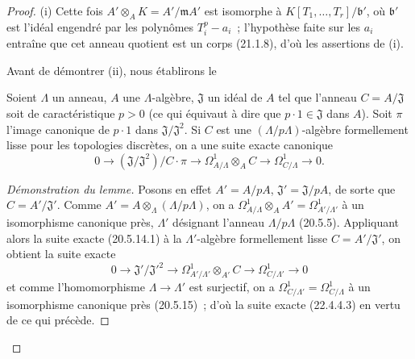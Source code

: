 \begin{proof}
(i) Cette fois $A'\otimes_AK=A'/\mathfrak mA'$ est isomorphe à
$K[T_1,\ldots,T_r]/\mathfrak b'$, où $\mathfrak b'$ est l'idéal engendré
par les polynômes $T_i^p-a_i$~; l'hypothèse faite sur les $a_i$ entraîne que
cet anneau quotient est un corps (21.1.8), d'où les assertions de (i).

Avant de démontrer (ii), nous établirons le

\begin{lemma}[22.4.4.2]
\label{0.22.4.4.2-fr}
Soient $\Lambda$ un anneau, $A$ une $\Lambda$-algèbre, $\mathfrak J$ un
idéal de $A$ tel que l'anneau $C=A/\mathfrak J$ soit de caractéristique
$p>0$ (ce qui équivaut à dire que $p\cdot1\in\mathfrak J$ dans $A$). Soit
$\pi$ l'image canonique de $p\cdot1$ dans
$\mathfrak J/\mathfrak J^2$. Si $C$ est une $(\Lambda/p\Lambda)$-algèbre
formellement lisse pour les topologies discrètes, on a une suite exacte
canonique
\begin{equation}
\label{0.22.4.4.3-fr}
  0\longrightarrow(\mathfrak J/\mathfrak J^2)/C\cdot\pi
  \longrightarrow\Omega^1_{A/\Lambda}\otimes_AC
  \longrightarrow\Omega^1_{C/\Lambda}\longrightarrow0.
  \tag{22.4.4.3}
\end{equation}
\end{lemma}

\begin{proof}[Démonstration du lemme]
Posons en effet $A'=A/pA$, $\mathfrak J'=\mathfrak J/pA$, de sorte que
$C=A'/\mathfrak J'$. Comme
$A'=A\otimes_\Lambda(\Lambda/p\Lambda)$, on a
$\Omega^1_{A/\Lambda}\otimes_AA'=\Omega^1_{A'/\Lambda'}$ à un
isomorphisme canonique près, $\Lambda'$ désignant l'anneau
$\Lambda/p\Lambda$ (20.5.5). Appliquant alors la suite exacte (20.5.14.1) à
la $\Lambda'$-algèbre formellement lisse $C=A'/\mathfrak J'$, on obtient la
suite exacte
\[
  0\longrightarrow\mathfrak J'/\mathfrak J'^2
  \longrightarrow\Omega^1_{A'/\Lambda'}\otimes_{A'}C
  \longrightarrow\Omega^1_{C/\Lambda'}\longrightarrow0
\]
et comme l'homomorphisme $\Lambda\to\Lambda'$ est surjectif, on a
$\Omega^1_{C/\Lambda'}=\Omega^1_{C/\Lambda}$ à un isomorphisme canonique
près (20.5.15)~; d'où la suite exacte (22.4.4.3) en vertu de ce qui précède.
\end{proof}


\end{proof}
